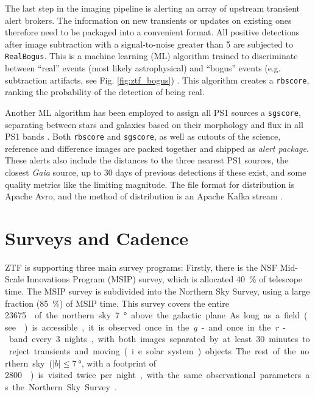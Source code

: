 The last step in the imaging pipeline is alerting an array of upstream transient alert brokers. The information on new transients or updates on existing ones therefore need to be packaged into a convenient format. All positive detections after image subtraction with a signal-to-noise greater than 5 are subjected to \texttt{RealBogus}. This is a machine learning (ML) algorithm trained to discriminate between ``real'' events (most likely astrophysical) and ``bogus'' events (e.g. subtraction artifacts, see Fig. \ref{fig:ztf_bogus}) . This algorithm creates a \texttt{rbscore}, ranking the probability of the detection of being real.

Another ML algorithm has been employed to assign all PS1 sources a \texttt{sgscore}, separating between stars and galaxies based on their morphology and flux in all PS1 bands . Both \texttt{rbscore} and \texttt{sgscore}, as well as cutouts of the science, reference and difference images are packed together and shipped as \textit{alert package}. These alerts also include the distances to the three nearest PS1 sources, the closest \textit{Gaia} source, up to 30 days of previous detections if these exist, and some quality metrics like the limiting magnitude. The file format for distribution is Apache Avro, and the method of distribution is an Apache Kafka stream .

\section{Surveys and Cadence}
ZTF is supporting three main survey programs: Firstly, there is the NSF Mid-Scale Innovations Program (MSIP) survey, which is allocated \SI{40}{\percent} of telescope time. The MSIP survey is subdivided into the Northern Sky Survey, using a large fraction (\SI{85}{\percent}) of MSIP time. This survey covers the entire \SI{23675}{\square\deg} of the northern sky \SI{7}{\degree} above the galactic plane. As long as a field (see ) is accessible, it is observed once in the \textit{g}- and once in the \textit{r}-band every 3 nights, with both images separated by at least 30 minutes to reject transients and moving (i.e. solar system) objects. The rest of the northern sky ($|b|\leq \SI{7}{\degree}$, with a footprint of \SI{2800}{\square\deg}) is visited twice per night, with the same observational parameters as the Northern Sky Survey .